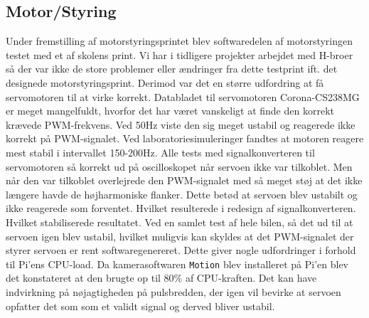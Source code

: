 \subsection{Motor/Styring} \label{sec:hwi_motor_styring}
Under fremstilling af motorstyringsprintet blev softwaredelen af motorstyringen testet med et af skolens print. 
Vi har i tidligere projekter arbejdet med H-broer så der var ikke de store problemer eller ændringer fra dette testprint ift. det designede motorstyringsprint.
Derimod var det en større udfordring at få servomotoren til at virke korrekt.  
Databladet til servomotoren Corona-CS238MG \cite{lib:Corona-CS238MG} er meget mangelfuldt, hvorfor det har været vanskeligt at finde den korrekt krævede PWM-frekvens. 
Ved 50Hz viste den sig meget ustabil og reagerede ikke korrekt på PWM-signalet. 
Ved laboratoriesimuleringer fandtes at motoren reagere mest stabil i intervallet 150-200Hz. 
Alle tests med signalkonverteren til servomotoren så korrekt ud på oscilloskopet når servoen ikke var tilkoblet. 
Men når den var tilkoblet overlejrede den PWM-signalet med så meget støj at det ikke længere havde de højharmoniske flanker. 
Dette betød at servoen blev ustabilt og ikke reagerede som forventet. 
Hvilket resulterede i redesign af signalkonverteren. 
Hvilket stabiliserede resultatet.
Ved en samlet test af hele bilen, så det ud til at servoen igen blev ustabil, hvilket muligvis kan skyldes at det PWM-signalet der styrer servoen er rent softwaregenereret. 
Dette giver nogle udfordringer i forhold til Pi'ens CPU-load. 
Da kamerasoftwaren \texttt{Motion} blev installeret på Pi'en blev det konstateret at den brugte op til 80\% af CPU-kraften. 
Det kan have indvirkning på nøjagtigheden på pulsbredden, der igen vil bevirke at servoen opfatter det som som et validt signal og derved bliver ustabil.

